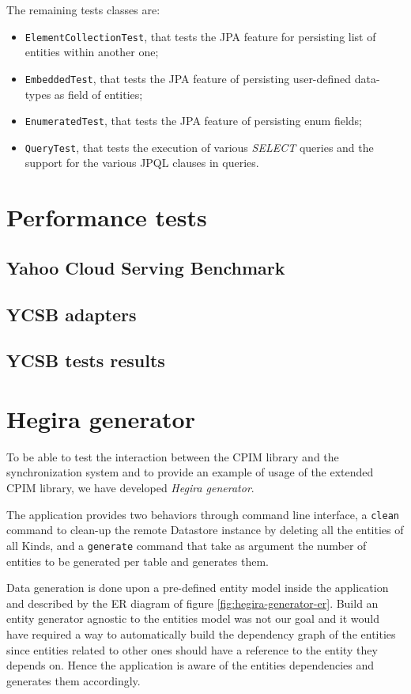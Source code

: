 \newparagraph The remaining tests classes are:
\begin{itemize}
\item \texttt{ElementCollectionTest}, that tests the JPA feature for persisting list of entities within another one;
\item \texttt{EmbeddedTest}, that tests the JPA feature of persisting user-defined data-types as field of entities;
\item \texttt{EnumeratedTest}, that tests the JPA feature of persisting enum fields;
\item \texttt{QueryTest}, that tests the execution of various \textit{SELECT} queries and the support for the various JPQL clauses in queries.
\end{itemize}

\section{Performance tests}
\label{sec:performance}

\subsection{Yahoo Cloud Serving Benchmark}
 
\subsection{YCSB adapters}

\subsection{YCSB tests results}

\section{Hegira generator}
\label{sec:data}
To be able to test the interaction between the CPIM library and the synchronization system and to provide an example of usage of the extended CPIM library, we have developed \textit{Hegira generator}.

\noindent The application provides two behaviors through command line interface, a \texttt{clean} command to clean-up the remote Datastore instance by deleting all the entities of all Kinds, and a \texttt{generate} command that take as argument the number of entities to be generated per table and generates them.

\newparagraph Data generation is done upon a pre-defined entity model inside the application and described by the ER diagram of figure \ref{fig:hegira-generator-er}.
Build an entity generator agnostic to the entities model was not our goal and it would have required a way to automatically build the dependency graph of the entities since entities related to other ones should have a reference to the entity they depends on. Hence the application is aware of the entities dependencies and generates them accordingly.

